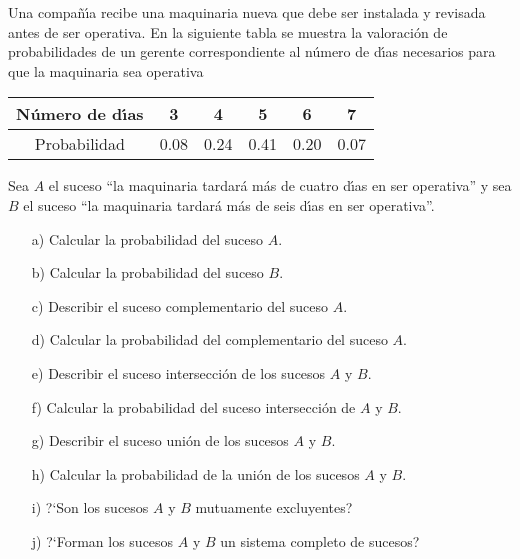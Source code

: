 \documentclass[12pt]{article}
\begin{document}
\probl %
    Una compa\~n\'{\i}a recibe una maquinaria nueva que debe ser instalada
    y revisada antes de ser ope\-ra\-ti\-va. En la siguiente tabla se muestra
    la valoraci\'on de probabilidades de un gerente correspondiente al
    n\'umero de d\'{\i}as necesarios para que la maquinaria sea operativa
    \begin{center}
        \begin{tabular}{|c||ccccc|}
        \hline
        N\'umero de d\'{\i}as & 3 & 4 & 5 & 6 & 7   \\
        \hline
        Probabilidad & 0.08 & 0.24 & 0.41 & 0.20 & 0.07  \\
        \hline
        \end{tabular}
    \end{center}
    Sea $A$ el suceso ``la maquinaria tardar\'a m\'as de cuatro d\'{\i}as
    en ser operativa'' y sea $B$ el suceso ``la maquinaria tardar\'a m\'as
    de seis d\'{\i}as en ser operativa''.
    \begin{itemize}
        \item [a)] Calcular la probabilidad del suceso $A$.

        \item [b)] Calcular la probabilidad del suceso $B$.

        \item [c)] Describir el suceso complementario del suceso $A$.

        \item [d)] Calcular la probabilidad del complementario del suceso
    $A$.

        \item [e)] Describir el suceso intersecci\'on de los sucesos $A$ y
    $B$.

        \item [f)] Calcular la probabilidad del suceso intersecci\'on de $A$
    y $B$.

        \item [g)] Describir el suceso uni\'on de los sucesos $A$ y $B$.

        \item [h)] Calcular la probabilidad de la uni\'on de los sucesos $A$
    y $B$.

        \item [i)] ?`Son los sucesos $A$ y $B$ mutuamente excluyentes?

        \item [j)] ?`Forman los sucesos $A$ y $B$ un sistema completo de
    sucesos?
    \end{itemize}
\end{document}
